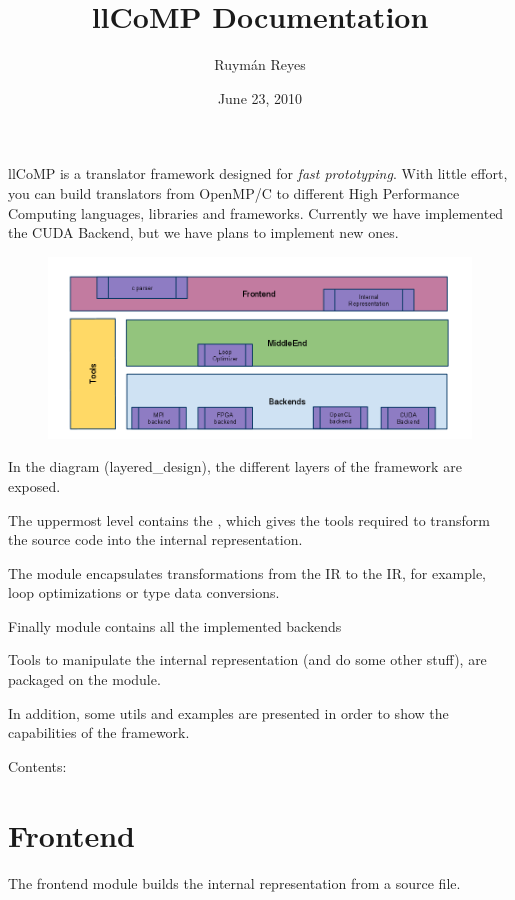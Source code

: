 \documentclass[a4paper,10pt,english]{manual}
\title{llCoMP Documentation}
\date{June 23, 2010}
\author{Ruymán Reyes}
\begin{document}
\maketitle
\tableofcontents
\hypertarget{--doc-index}{}


llCoMP is a translator framework designed for \emph{fast prototyping}.
With little effort, you can build translators from OpenMP/C to different High
Performance Computing languages, libraries and frameworks.  Currently we have
implemented the CUDA Backend, but we have plans to implement new ones.
\hypertarget{layered-design}{}\begin{figure}[htbp]
\centering

\includegraphics{layered_design.png}
\end{figure}

In the diagram (layered\_design), the different layers of the framework are exposed.

The uppermost level contains the \hyperlink{module-Frontend}{}, which gives the tools required to transform
the source code into the internal representation.

The  module encapsulates transformations from the IR to the IR, for example,
loop optimizations or type data conversions.

Finally \hyperlink{module-Backends}{} module contains all the implemented backends

Tools to manipulate the internal representation (and do some other stuff), are packaged
on the \hyperlink{module-Tools}{} module.

In addition, some utils and examples are presented in order to show the capabilities of the framework.

Contents:

\resetcurrentobjects
\hypertarget{--doc-frontend}{}

\chapter{Frontend}
\hypertarget{module-Frontend}{}
The frontend module builds the internal representation from a source file.
\end{document}
